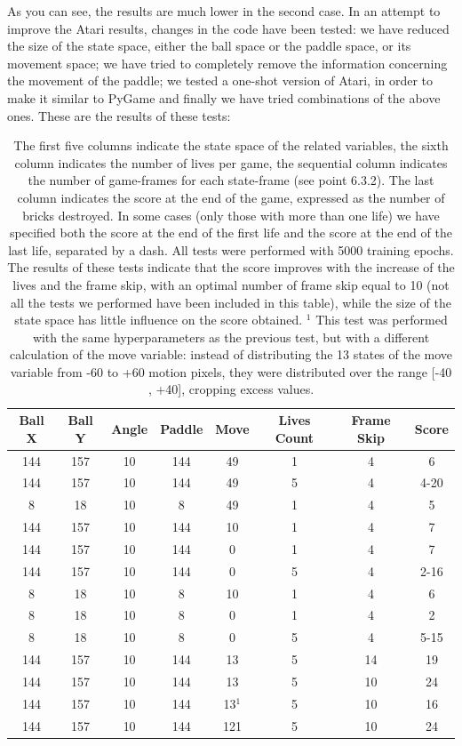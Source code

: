 As you can see, the results are much lower in the second case. In an attempt to improve the Atari results, changes in the code have been tested: we have reduced the size of the state space, either the ball space or the paddle space, or its movement space; we have tried to completely remove the information concerning the movement of the paddle; we tested a one-shot version of Atari, in order to make it similar to PyGame and finally we have tried combinations of the above ones. These are the results of these tests:

\begin{table}
	\centering
	\begin{tabular}{*{8}{c}}
		Ball X & Ball Y & Angle & Paddle & Move & Lives Count & Frame Skip & Score \\
		\hline
		144 & 157 & 10 & 144 & 49 & 1 & 4 & 6 \\
		144 & 157 & 10 & 144 & 49 & 5 & 4 & 4-20 \\
		8 & 18 & 10 & 8 & 49 & 1 & 4 & 5 \\
		144 & 157 & 10 & 144 & 10 & 1 & 4 & 7 \\
		144 & 157 & 10 & 144 & 0 & 1 & 4 & 7 \\
		144 & 157 & 10 & 144 & 0 & 5 & 4 & 2-16 \\
		8 & 18 & 10 & 8 & 10 & 1 & 4 & 6 \\
		8 & 18 & 10 & 8 & 0 & 1 & 4 & 2 \\
		8 & 18 & 10 & 8 & 0 & 5 & 4 & 5-15 \\
		\hline
		144 & 157 & 10 & 144 & 13 & 5 & 14 & 19 \\
		144 & 157 & 10 & 144 & 13 & 5 & 10 & 24 \\
		144 & 157 & 10 & 144 & 13$^1$ & 5 & 10 & 16 \\
		144 & 157 & 10 & 144 & 121 & 5 & 10 & 24 \\
	\end{tabular}
	\caption{The first five columns indicate the state space of the related variables, the sixth column indicates the number of lives per game, the sequential column indicates the number of game-frames for each state-frame (see point 6.3.2). The last column indicates the score at the end of the game, expressed as the number of bricks destroyed. In some cases (only those with more than one life) we have specified both the score at the end of the first life and the score at the end of the last life, separated by a dash. All tests were performed with 5000 training epochs. The results of these tests indicate that the score improves with the increase of the lives and the frame skip, with an optimal number of frame skip equal to 10 (not all the tests we performed have been included in this table), while the size of the state space has little influence on the score obtained. $^1$ This test was performed with the same hyperparameters as the previous test, but with a different calculation of the move variable: instead of distributing the 13 states of the move variable from -60 to +60 motion pixels, they were distributed over the range [-40 , +40], cropping excess values.}
\end{table}

